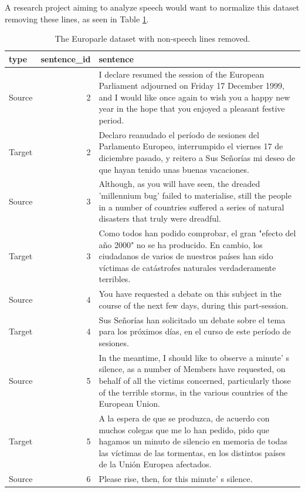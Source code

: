 \documentclass[
]{article}
\begin{document}
A research project aiming to analyze speech would want to normalize this dataset removing these lines, as seen in Table \ref{tab:normalize-non-speech-remove-europarle}.

\begin{table}

\caption{\label{tab:normalize-non-speech-remove-europarle}The Europarle dataset with non-speech lines removed.}
\centering
\begin{tabular}[t]{lrl}
\toprule
type & sentence\_id & sentence\\
\midrule
Source & 2 & I declare resumed the session of the European Parliament adjourned on Friday 17 December 1999, and I would like once again to wish you a happy new year in the hope that you enjoyed a pleasant festive period.\\
Target & 2 & Declaro reanudado el período de sesiones del Parlamento Europeo, interrumpido el viernes 17 de diciembre pasado, y reitero a Sus Señorías mi deseo de que hayan tenido unas buenas vacaciones.\\
Source & 3 & Although, as you will have seen, the dreaded 'millennium bug' failed to materialise, still the people in a number of countries suffered a series of natural disasters that truly were dreadful.\\
Target & 3 & Como todos han podido comprobar, el gran "efecto del año 2000" no se ha producido. En cambio, los ciudadanos de varios de nuestros países han sido víctimas de catástrofes naturales verdaderamente terribles.\\
Source & 4 & You have requested a debate on this subject in the course of the next few days, during this part-session.\\
\addlinespace
Target & 4 & Sus Señorías han solicitado un debate sobre el tema para los próximos días, en el curso de este período de sesiones.\\
Source & 5 & In the meantime, I should like to observe a minute' s silence, as a number of Members have requested, on behalf of all the victims concerned, particularly those of the terrible storms, in the various countries of the European Union.\\
Target & 5 & A la espera de que se produzca, de acuerdo con muchos colegas que me lo han pedido, pido que hagamos un minuto de silencio en memoria de todas las víctimas de las tormentas, en los distintos países de la Unión Europea afectados.\\
Source & 6 & Please rise, then, for this minute' s silence.\\

\end{tabular}
\end{table}
\end{document}
